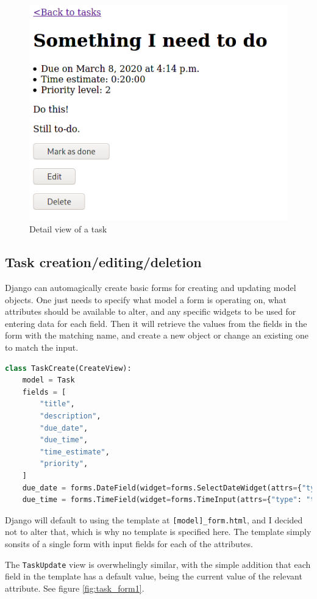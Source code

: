 \documentclass{article}
\begin{document}
\begin{figure}[H]
  \centering
  \includegraphics[width=0.6\linewidth]{Screenshots/task_detail.png}
  \caption{Detail view of a task}
  \label{fig:task_detail1}
\end{figure}

\subsection{Task creation/editing/deletion}
Django can automagically create basic forms for creating and updating model objects.
One just needs to specify what model a form is operating on,
what attributes should be available to alter,
and any specific widgets to be used for entering data for each field.
Then it will retrieve the values from the fields in the form with the matching name,
and create a new object or change an existing one to match the input.

\begin{lstlisting}[language=Python, breaklines]
class TaskCreate(CreateView):
    model = Task
    fields = [
        "title",
        "description",
        "due_date",
        "due_time",
        "time_estimate",
        "priority",
    ]
    due_date = forms.DateField(widget=forms.SelectDateWidget(attrs={"type": "date"}))
    due_time = forms.TimeField(widget=forms.TimeInput(attrs={"type": "time"}))
\end{lstlisting}

Django will default to using the template at \texttt{[model]\_form.html},
and I decided not to alter that,
which is why no template is specified here.
The template simply sonsits of a single form with input fields for each of the attributes.

The \texttt{TaskUpdate} view is overwhelingly similar,
with the simple addition that each field in the template has a default value,
being the current value of the relevant attribute.
See figure \ref{fig:task_form1}.
\end{document}
